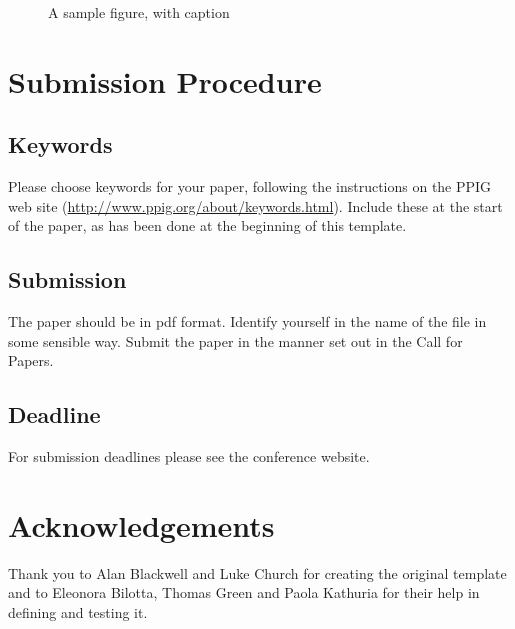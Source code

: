 \documentclass{ppig}
\begin{document}
\begin{figure}
  \centering
  \caption{A sample figure, with caption}
  \label{fig:sample-figure}
\end{figure}


\section{Submission Procedure}

\subsection{Keywords}
Please choose keywords for your paper, following the instructions on the PPIG
web site (\url{http://www.ppig.org/about/keywords.html}). Include these at the
start of the paper, as has been done at the beginning of this template.

\subsection{Submission}
The paper should be in pdf format. Identify yourself in the name of the file in
some sensible way. Submit the paper in the manner set out in the Call for
Papers.

\subsection*{Deadline}
For submission deadlines please see the conference website. 

\section{Acknowledgements}
Thank you to Alan Blackwell and Luke Church for creating the original template
and to Eleonora Bilotta, Thomas Green and Paola Kathuria for their help in
defining and testing it.


 
\end{document}

